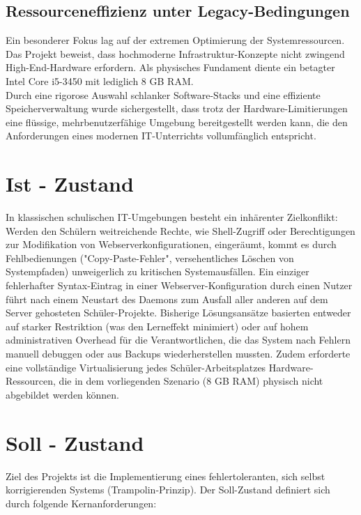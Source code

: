 \documentclass[11pt,
a4paper,
numbers=nonperiod,
footsepline,
oneside,
numbers=noenddot,
bibliography=totoc
]{scrartcl}
\begin{document}
\subsection{Ressourceneffizienz unter Legacy-Bedingungen}
Ein besonderer Fokus lag auf der extremen Optimierung der Systemressourcen. Das Projekt beweist, dass hochmoderne Infrastruktur-Konzepte nicht zwingend High-End-Hardware erfordern. Als physisches Fundament diente ein betagter Intel Core i5-3450 mit lediglich 8 GB RAM.\\

Durch eine rigorose Auswahl schlanker Software-Stacks und eine effiziente Speicherverwaltung wurde sichergestellt, dass trotz der Hardware-Limitierungen eine flüssige, mehrbenutzerfähige Umgebung bereitgestellt werden kann, die den Anforderungen eines modernen IT-Unterrichts vollumfänglich entspricht.

\section{Ist - Zustand}
In klassischen schulischen IT-Umgebungen besteht ein inhärenter Zielkonflikt: Werden den Schülern weitreichende Rechte, wie Shell-Zugriff oder Berechtigungen zur Modifikation von Webserverkonfigurationen, eingeräumt, kommt es durch Fehlbedienungen ("Copy-Paste-Fehler", versehentliches Löschen von Systempfaden) unweigerlich zu kritischen Systemausfällen.
Ein einziger fehlerhafter Syntax-Eintrag in einer Webserver-Konfiguration durch einen Nutzer führt nach einem Neustart des Daemons zum Ausfall aller anderen auf dem Server gehosteten Schüler-Projekte.
Bisherige Lösungsansätze basierten entweder auf starker Restriktion (was den Lerneffekt minimiert) oder auf hohem administrativen Overhead für die Verantwortlichen, die das System nach Fehlern manuell debuggen oder aus Backups wiederherstellen mussten. Zudem erforderte eine vollständige Virtualisierung jedes Schüler-Arbeitsplatzes Hardware-Ressourcen, die in dem vorliegenden Szenario (8 GB RAM) physisch nicht abgebildet werden können.	
		
\section{Soll - Zustand}
Ziel des Projekts ist die Implementierung eines fehlertoleranten, sich selbst korrigierenden Systems (Trampolin-Prinzip). Der Soll-Zustand definiert sich durch folgende Kernanforderungen:
\end{document}
